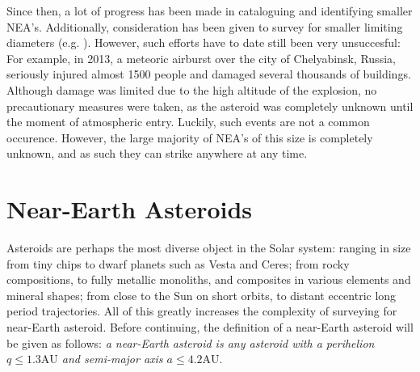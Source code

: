 Since then, a lot of progress has been made in cataloguing and identifying smaller NEA's. Additionally, consideration has been given to survey for smaller limiting diameters (e.g. \cite{2003NEOSDT}). However, such efforts have to date still been very unsuccesful: For example, in 2013, a meteoric airburst over the city of Chelyabinsk, Russia, seriously injured almost 1500 people and damaged several thousands of buildings. Although damage was limited due to the high altitude of the explosion, no precautionary measures were taken, as the asteroid was completely unknown until the moment of atmospheric entry. Luckily, such events are not a common occurence. However, the large majority of NEA's of this size is completely unknown, and as such they can strike anywhere at any time. 

\section{Near-Earth Asteroids}
Asteroids are perhaps the most diverse object in the Solar system: ranging in size from tiny chips to dwarf planets such as Vesta and Ceres; from rocky compositions, to fully metallic monoliths, and composites in various elements and mineral shapes; from close to the Sun on short orbits, to distant eccentric long period trajectories. All of this greatly increases the complexity of surveying for near-Earth asteroid. Before continuing, the definition of a near-Earth asteroid will be given as follows: \textit{a near-Earth asteroid is any asteroid with a perihelion $q \leq 1.3 \mathrm{AU}$ and semi-major axis $a \leq 4.2 \mathrm{AU}$}. \\

